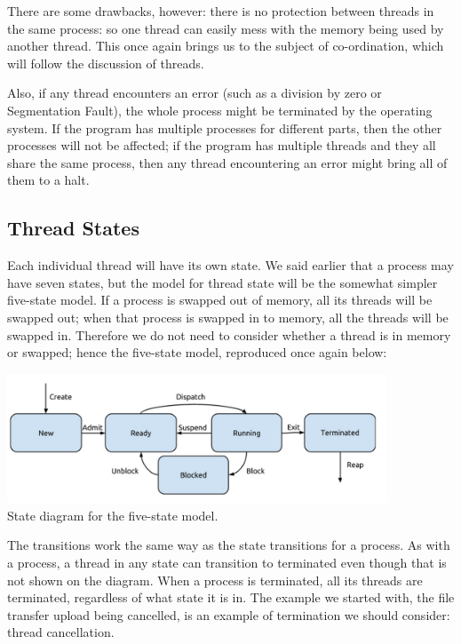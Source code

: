There are some drawbacks, however: there is no protection between threads in the same process: so one thread can easily mess with the memory being used by another thread. This once again brings us to the subject of co-ordination, which will follow the discussion of threads.

Also, if any thread encounters an error (such as a division by zero or Segmentation Fault), the whole process might be terminated by the operating system. If the program has multiple processes for different parts, then the other processes will not be affected; if the program has multiple threads and they all share the same process, then any thread encountering an error might bring all of them to a halt.


\subsection*{Thread States}
Each individual thread will have its own state. We said earlier that a process may have seven states, but the model for thread state will be the somewhat simpler five-state model. If a process is swapped out of memory, all its threads will be swapped out; when that process is swapped in to memory, all the threads will be swapped in. Therefore we do not need to consider whether a thread is in memory or swapped; hence the five-state model, reproduced once again below:

\begin{center}
\includegraphics[width=0.85\textwidth]{images/5-state-model.png}\\
State diagram for the five-state model.
\end{center}

The transitions work the same way as the state transitions for a process. As with a process, a thread in any state can transition to terminated even though that is not shown on the diagram. When a process is terminated, all its threads are terminated, regardless of what state it is in. The example we started with, the file transfer upload being cancelled, is an example of termination we should consider: thread cancellation.

